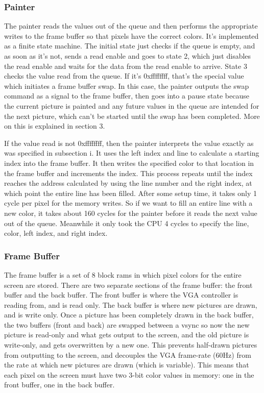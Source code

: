 \documentclass[onecolumn]{IEEEtran}
\begin{document}
\subsubsection{Painter}
The painter reads the values out of the queue and then performs the appropriate writes to the frame buffer so that pixels have the correct colors.  It’s implemented as a finite state machine.  The initial state just checks if the queue is empty, and as soon as it’s not, sends a read enable and goes to state 2, which just disables the read enable and waits for the data from the read enable to arrive.  State 3 checks the value read from the queue.  If it’s 0xffffffff, that’s the special value which initiates a frame buffer swap.  In this case, the painter outputs the swap command as a signal to the frame buffer, then goes into a pause state because the current picture is painted and any future values in the queue are intended for the next picture, which can’t be started until the swap has been completed.  More on this is explained in section 3.

If the value read is not 0xffffffff, then the painter interprets the value exactly as was specified in subsection i.  It uses the left index and line to calculate a starting index into the frame buffer.  It then writes the specified color to that location in the frame buffer and increments the index.  This process repeats until the index reaches the address calculated by using the line number and the right index, at which point the entire line has been filled.  After some setup time, it takes only 1 cycle per pixel for the memory writes.  So if we want to fill an entire line with a new color, it takes about 160 cycles for the painter before it reads the next value out of the queue.  Meanwhile it only took the CPU 4 cycles to specify the line, color, left index, and right index.

\subsubsection{Frame Buffer}
The frame buffer is a set of 8 block rams in which pixel colors for the entire screen are stored.  There are two separate sections of the frame buffer: the front buffer and the back buffer.  The front buffer is where the VGA controller is reading from, and is read only.  The back buffer is where new pictures are drawn, and is write only.  Once a picture has been completely drawn in the back buffer, the two buffers (front and back) are swapped between a vsync so now the new picture is read-only and what gets output to the screen, and the old picture is write-only, and gets overwritten by a new one.  This prevents half-drawn pictures from outputting to the screen, and decouples the VGA frame-rate (60Hz) from the rate at which new pictures are drawn (which is variable).  This means that each pixel on the screen must have two 3-bit color values in memory: one in the front buffer, one in the back buffer.  
\end{document}
